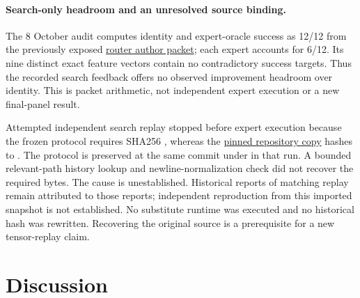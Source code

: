 \documentclass[11pt]{article}
\begin{document}
\paragraph{Search-only headroom and an unresolved source binding.}
The 8 October  audit computes
identity and expert-oracle success as 12/12 from the previously exposed
\href{https://github.com/Sanokei/CellForge/blob/02beaf18251fca5ed1f1eb55e92f00a3e3820e88/runs/weights-native-composition01-20261006/AUTHORING/router_founder.txt}{router author packet};
each expert accounts for 6/12. Its nine distinct exact feature vectors contain no
contradictory success targets. Thus the recorded search feedback offers no observed
improvement headroom over identity. This is packet arithmetic, not independent expert
execution or a new final-panel result.

Attempted independent search replay stopped before expert execution because the frozen
protocol requires  SHA256
,
whereas the
\href{https://github.com/Sanokei/CellForge/blob/02beaf18251fca5ed1f1eb55e92f00a3e3820e88/runs/weights-native-composition01-20261006/HOST_EVALUATION/runtime/skillcore.py}{pinned repository copy}
hashes to
.
The protocol is preserved at the same commit under
 in that run. A bounded relevant-path history lookup
and newline-normalization check did not recover the required bytes. The cause is
unestablished. Historical reports of matching replay remain attributed to those reports;
independent reproduction from this imported snapshot is not established. No substitute
runtime was executed and no historical hash was rewritten. Recovering the original
source is a prerequisite for a new tensor-replay claim.


\section{Discussion}
\end{document}
